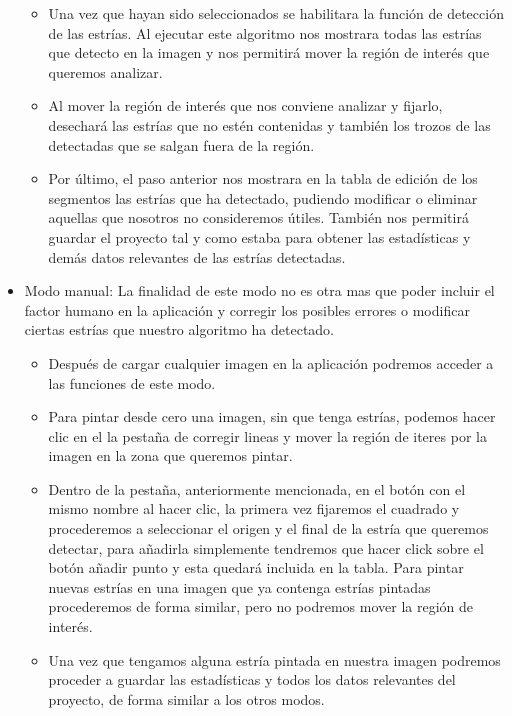 \begin{itemize}
\begin{itemize}
		\item Una vez que hayan sido seleccionados se habilitara la función de detección de las estrías. Al ejecutar este algoritmo nos mostrara todas las estrías que detecto en la imagen y nos permitirá mover la región de interés que queremos analizar.
		\item Al mover la región de interés que nos conviene analizar y fijarlo, desechará las estrías que no estén contenidas y también los trozos de las detectadas que se salgan fuera de la región.
		\item Por último, el paso anterior nos mostrara en la tabla de edición de los segmentos las estrías que ha detectado, pudiendo modificar o eliminar aquellas que nosotros no consideremos útiles.
		También nos permitirá guardar el proyecto tal y como estaba para obtener las estadísticas y demás datos relevantes de las estrías detectadas.
	\end{itemize}
	\item Modo manual:
	La finalidad de este modo no es otra mas que poder incluir el factor humano en la aplicación y corregir los posibles errores o modificar ciertas estrías que nuestro algoritmo ha detectado.
	\begin{itemize}
		\item Después de cargar cualquier imagen en la aplicación podremos acceder a las funciones de este modo.
		\item Para pintar desde cero una imagen, sin que tenga estrías, podemos hacer clic en el la pestaña de corregir lineas y mover la región de iteres por la imagen en la zona que queremos pintar. 
		\item Dentro de la pestaña, anteriormente mencionada, en el botón con el mismo nombre al hacer clic, la primera vez fijaremos el cuadrado y procederemos a seleccionar el origen y el final de la estría que queremos detectar, para añadirla simplemente tendremos que hacer click sobre el botón añadir punto y esta quedará incluida en la tabla. Para pintar nuevas estrías en una imagen que ya contenga estrías pintadas procederemos de forma similar, pero no podremos mover la región de interés. 
		\item Una vez que tengamos alguna estría pintada en nuestra imagen podremos proceder a guardar las estadísticas y todos los datos relevantes del proyecto, de forma similar a los otros modos.
	\end{itemize}

\end{itemize}

